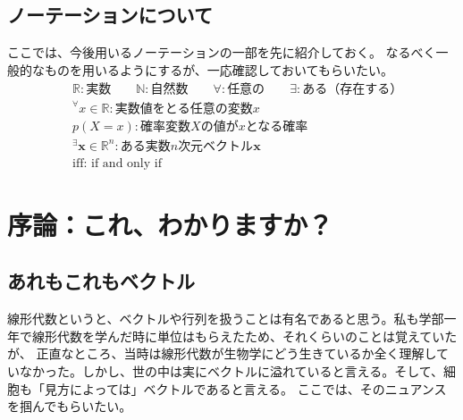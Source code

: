 \documentclass[10pt]{ujarticle}
\begin{document}
\subsection{ノーテーションについて}
ここでは、今後用いるノーテーションの一部を先に紹介しておく。
なるべく一般的なものを用いるようにするが、一応確認しておいてもらいたい。
$$
\begin{aligned}
  & \mathbb{R}:\text{実数}\qquad\mathbb{N}:\text{自然数}\qquad\forall:\text{任意の}\qquad\exists:\text{ある（存在する）}\\
  & ^\forall x \in \mathbb{R}:\text{実数値をとる任意の変数} x \\
  & p(X=x):\text{確率変数} X \text{の値が} x \text{となる確率}\\
  & ^\exists\mathbf{x}\in\mathbb{R}^n:\text{ある実数} n \text{次元ベクトル}\mathbf{x}\\
  & \text{iff: if and only if}
\end{aligned}
$$

\section{序論：これ、わかりますか？}
\subsection{あれもこれもベクトル}
線形代数というと、ベクトルや行列を扱うことは有名であると思う。私も学部一年で線形代数を学んだ時に単位はもらえたため、それくらいのことは覚えていたが、
正直なところ、当時は線形代数が生物学にどう生きているか全く理解していなかった。しかし、世の中は実にベクトルに溢れていると言える。そして、細胞も「見方によっては」ベクトルであると言える。
ここでは、そのニュアンスを掴んでもらいたい。
\end{document}
